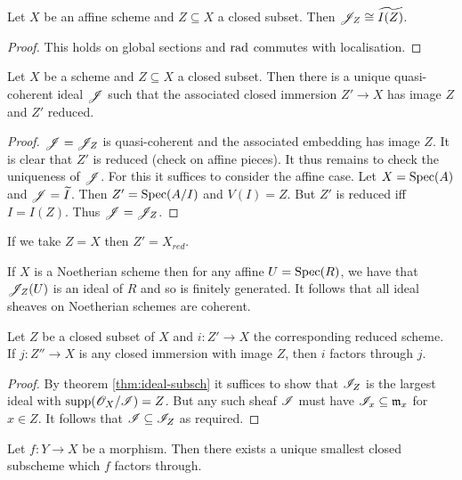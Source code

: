 \documentclass{memoir}
\begin{document}
\begin{lemma}
    Let $X$ be an affine scheme and $Z\subseteq X$ a closed subset. 
    Then $\mathscr{J}_Z\cong \widetilde{I(Z)}$.
\end{lemma}
\begin{proof}
    This holds on global sections and $\text{rad}$ commutes with localisation.
\end{proof}
\begin{thm}
    Let $X$ be a scheme and $Z\subseteq X$ a closed subset.
    Then there is a unique quasi-coherent ideal $\mathscr{J}$ such that the associated closed immersion $Z'\to X$ has image $Z$ and $Z'$ reduced.
\end{thm}
\begin{proof}
    $\mathscr{J} = \mathscr{J}_Z$ is quasi-coherent and the associated embedding has image $Z$.
    It is clear that $Z'$ is reduced (check on affine pieces).
    It thus remains to check the uniqueness of $\mathscr{J}$.
    For this it suffices to consider the affine case.
    Let $X = \operatorname{Spec}(A)$ and $\mathscr{J} = \widetilde I$. 
    Then $Z' = \operatorname{Spec}(A/I)$ and $V(I) = Z$.
    But $Z'$ is reduced iff $I = I(Z)$.
    Thus $\mathscr{J} = \mathscr{J}_{Z}$.
\end{proof}
\begin{remark}
    If we take $Z = X$ then $Z' = X_{red}$.
\end{remark}
\begin{remark}
    If $X$ is a Noetherian scheme then for any affine $U = \operatorname{Spec}(R)$, we have that $\mathscr{J}_Z(U)$ is an ideal of $R$ and so is finitely generated.
    It follows that all ideal sheaves on Noetherian schemes are coherent.
\end{remark}
\begin{proposition}
    Let $Z$ be a closed subset of $X$ and $i:Z'\to X$ the corresponding reduced scheme.
    If $j:Z''\to X$ is any closed immersion with image $Z$, then $i$ factors through $j$.
\end{proposition}
\begin{proof}
    By theorem \ref{thm:ideal-subsch} it suffices to show that $\mathscr{I}_Z$ is the largest ideal with $\text{supp}(\mathscr{O}_X/\mathscr{I}) = Z$.
    But any such sheaf $\mathscr{I}$ must have $\mathscr{I}_x\subseteq \mathfrak{m}_x$ for $x\in Z$.
    It follows that $\mathscr{I}\subseteq \mathscr{I}_Z$ as required.
\end{proof}
\begin{proposition}
    Let $f:Y\to X$ be a morphism. 
    Then there exists a unique smallest closed subscheme which $f$ factors through.
\end{proposition}
\end{document}
